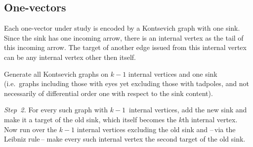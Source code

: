 \documentclass[a4paper]{jpconf}%
\theoremstyle{definition}
\newtheorem{example}{Example}%
\theoremstyle{remark}
\begin{document}
\subsection{\textbf{One\/-\/vectors}}
Each one\/-\/vector under study is encoded by a Kontsevich graph with one sink.
Since the sink has one incoming arrow, there is an %
internal vertex 
as the tail of this incoming arrow. %
The target of another edge  issued from this internal vertex can be any internal vertex other then itself. 

\smallskip
{} 
Generate all Kontsevich graphs on $k-1$ internal vertices and one sink
(i.e.\ graphs including those with eyes yet excluding those with tadpoles, 
and not necessarily of differential order one with respect to the sink content). 

\noindent%
{\textit{Step~2.}} For every such graph with $k-1$~internal vertices,
add the new sink and make it a target of the old sink, which itself becomes the
$k$th internal vertex.
Now run over the $k-1$ internal vertices excluding the old sink and --\,via the Leibniz rule\,-- make every such internal vertex the second target of the old sink.


\end{document}
